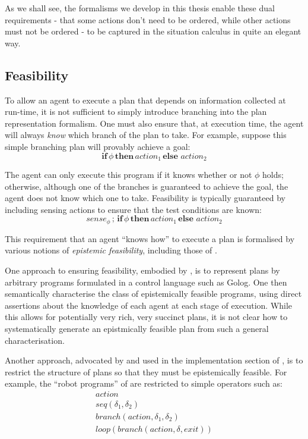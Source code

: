 As we shall see, the formalisms we develop in this thesis enable these
dual requirements - that some actions don't need to be ordered, while
other actions must not be ordered - to be captured in the situation
calculus in quite an elegant way.


\subsection{Feasibility}

To allow an agent to execute a plan that depends on information collected
at run-time, it is not sufficient to simply introduce branching into
the plan representation formalism. One must also ensure that, at execution
time, the agent will always \emph{know} which branch of the plan to
take. For example, suppose this simple branching plan will provably
achieve a goal:\[
\mathbf{if}\,\phi\,\mathbf{then}\, action_{1}\,\mathbf{else\,}\, action_{2}\]


The agent can only execute this program if it knows whether or not
$\phi$ holds; otherwise, although one of the branches is guaranteed
to achieve the goal, the agent does not know which one to take. Feasibility
is typically guaranteed by including sensing actions to ensure that
the test conditions are known:\[
sense_{\phi}\,;\,\mathbf{if}\,\phi\,\mathbf{then}\, action_{1}\,\mathbf{else\,}\, action_{2}\]


This requirement that an agent {}``knows how'' to execute a plan
is formalised by various notions of \emph{epistemic feasibility},
including those of \citep{levesque98what_robots_can_do,levesque00knowing_how,Lesperance01epi_feas_casl,giacomo04sem_delib_indigolog,baier06programs_that_sense}.

One approach to ensuring feasibility, embodied by \citep{levesque00knowing_how,giacomo04sem_delib_indigolog,baier06programs_that_sense},
is to represent plans by arbitrary programs formulated in a control
language such as Golog. One then semantically characterise the class
of epistemically feasible programs, using direct assertions about
the knowledge of each agent at each stage of execution. While this
allows for potentially very rich, very succinct plans, it is not clear
how to systematically generate an epistmically feasible plan from
such a general characterisation.

Another approach, advocated by \citep{levesque96what_is_planning,levesque98what_robots_can_do}
and used in the implementation section of \citep{giacomo04sem_delib_indigolog},
is to restrict the structure of plans so that they must be epistemically
feasible. For example, the {}``robot programs'' of \citep{levesque98what_robots_can_do}
are restricted to simple operators such as:\begin{gather*}
action\\
seq(\delta_{1},\delta_{2})\\
branch(action,\delta_{1},\delta_{2})\\
loop(branch(action,\delta,exit))\end{gather*}


